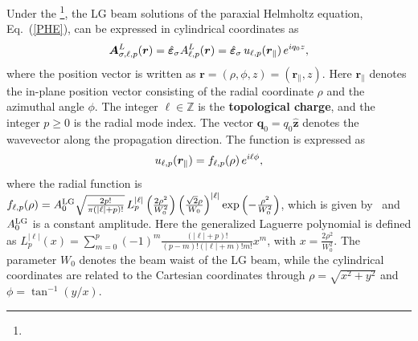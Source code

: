 Under the \footnote{}, the LG beam solutions of the paraxial Helmholtz equation, Eq.~(\ref{PHE}), can be expressed in cylindrical coordinates as
\begin{equation}
\color{G}
\boldsymbol{A}^{L}_{\sigma, \ell, p}(\boldsymbol{r})
=
\hat{\boldsymbol{\varepsilon}}_\sigma  A^{L}_{\ell, p}(\boldsymbol{r})
=
\hat{\boldsymbol{\varepsilon}}_\sigma 
\, u_{\ell, p}(\boldsymbol{r}_\parallel)
\, e^{i q_0 z},
\label{LGbeam}
\end{equation}
where the position vector is written as $\boldsymbol{r}=(\rho,\phi,z)=(\boldsymbol{r}_\parallel,z)$. Here $\boldsymbol{r}_\parallel$ denotes the in-plane position vector consisting of the radial coordinate $\rho$ and the azimuthal angle $\phi$. The integer $\ell\in\mathbb{Z}$ is the \textbf{topological charge}, and the integer $p\ge0$ is the radial mode index. The vector $\boldsymbol{q}_0 = q_0 \hat{\boldsymbol{z}}$ denotes the wavevector along the propagation direction. The  function is expressed as
\begin{equation}
\color{G}
u_{\ell, p}(\boldsymbol{r}_\parallel)=f_{\ell, p}(\rho)\,e^{i\ell\phi},
\end{equation}
where the radial function is $f_{\ell, p}(\rho)
=
A^{\rm LG}_0\sqrt{\frac{2p!}{\pi(|\ell|+p)!}}
\,
L_p^{|\ell|}
\left(
\frac{2\rho^2}{W_0^2}
\right)
\left(
\frac{\sqrt{2}\rho}{W_0}
\right)^{|\ell|}
\exp\left(
-\frac{\rho^2}{W_0^2}
\right)$, which is given by~\cite{romero2002quantum, peng2022tailoring, sanchez2024enhanced} and $A^{\rm LG}_0$ is a constant amplitude. Here the generalized Laguerre polynomial is defined as $L_p^{|\ell|}(x)
=
\sum_{m=0}^{p}
(-1)^m
\frac{(|\ell|+p)!}{(p-m)!(|\ell|+m)!m!}
x^m$, with $x=\frac{2\rho^2}{W_0^2}$. The parameter $W_0$ denotes the beam waist of the LG beam, while the cylindrical coordinates are related to the Cartesian coordinates through $\rho=\sqrt{x^2+y^2}$ and $\phi=\tan^{-1}(y/x)$. 

